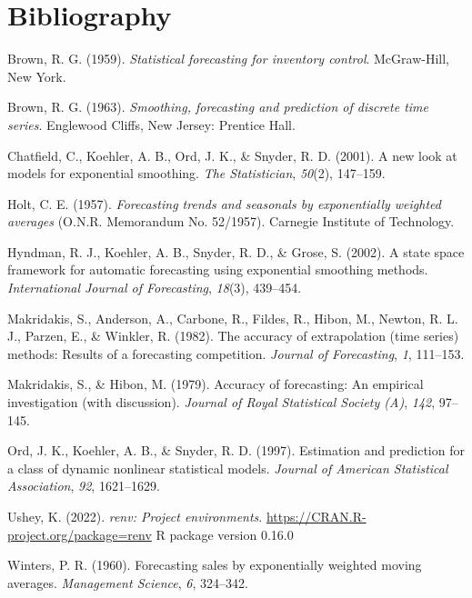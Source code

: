 \documentclass{uniexeterthesis}
\begin{document}

\hypertarget{bibliography}{%
\chapter*{Bibliography}\label{bibliography}}


\hypertarget{refs}{}
\begin{CSLReferences}{1}{0}
\leavevmode{}%
Brown, R. G. (1959). \emph{Statistical forecasting for inventory
control}. McGraw-Hill, New York.

\leavevmode{}%
Brown, R. G. (1963). \emph{Smoothing, forecasting and prediction of
discrete time series}. Englewood Cliffs, New Jersey: Prentice Hall.

\leavevmode{}%
Chatfield, C., Koehler, A. B., Ord, J. K., \& Snyder, R. D. (2001). A
new look at models for exponential smoothing. \emph{The Statistician},
\emph{50}(2), 147--159.

\leavevmode{}%
Holt, C. E. (1957). \emph{Forecasting trends and seasonals by
exponentially weighted averages} (O.N.R. Memorandum No. 52/1957).
Carnegie Institute of Technology.

\leavevmode{}%
Hyndman, R. J., Koehler, A. B., Snyder, R. D., \& Grose, S. (2002). A
state space framework for automatic forecasting using exponential
smoothing methods. \emph{International Journal of Forecasting},
\emph{18}(3), 439--454.

\leavevmode{}%
Makridakis, S., Anderson, A., Carbone, R., Fildes, R., Hibon, M.,
Newton, R. L. J., Parzen, E., \& Winkler, R. (1982). The accuracy of
extrapolation (time series) methods: Results of a forecasting
competition. \emph{Journal of Forecasting}, \emph{1}, 111--153.

\leavevmode{}%
Makridakis, S., \& Hibon, M. (1979). Accuracy of forecasting: An
empirical investigation (with discussion). \emph{Journal of Royal
Statistical Society (A)}, \emph{142}, 97--145.

\leavevmode{}%
Ord, J. K., Koehler, A. B., \& Snyder, R. D. (1997). Estimation and
prediction for a class of dynamic nonlinear statistical models.
\emph{Journal of American Statistical Association}, \emph{92},
1621--1629.

\leavevmode{}%
Ushey, K. (2022). \emph{{renv}: Project environments}.
\url{https://CRAN.R-project.org/package=renv} R package version 0.16.0

\leavevmode{}%
Winters, P. R. (1960). Forecasting sales by exponentially weighted
moving averages. \emph{Management Science}, \emph{6}, 324--342.

\end{CSLReferences}
\end{document}
